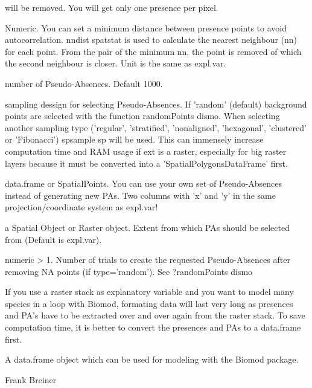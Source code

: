 \documentclass[a4paper]{book}
\begin{document}
\begin{Arguments}
\begin{ldescription}
will be removed. You will get only one presence per pixel.
\item[\code{mindist}] Numeric. You can set a minimum distance between presence points to avoid
autocorrelation. nndist spatstat is used to calculate the nearest neighbour (nn)
for each point. From the pair of the minimum nn, the point is removed of which the second
neighbour is closer. Unit is the same as expl.var.
\item[\code{n}] number of Pseudo-Absences. Default 1000.
\item[\code{type}] sampling dessign for selecting Pseudo-Absences. If \bsl{}'random\bsl{}' (default) background points are selected with the 
function randomPoints dismo. When selecting another sampling type (\bsl{}'regular\bsl{}', \bsl{}'stratified\bsl{}', \bsl{}'nonaligned\bsl{}',
\bsl{}'hexagonal\bsl{}', \bsl{}'clustered\bsl{}' or \bsl{}'Fibonacci\bsl{}') spsample sp will be used. This can immensely increase computation time and RAM usage if ext is a raster,
especially for big raster layers because it must be converted into a  \bsl{}'SpatialPolygonsDataFrame\bsl{}' first.
\item[\code{PApoint}] data.frame or SpatialPoints. You can use your own set of Pseudo-Absences
instead of generating new PAs. Two columns with \bsl{}'x\bsl{}' and \bsl{}'y\bsl{}' in the same
projection/coordinate system as expl.var!
\item[\code{ext}] a Spatial Object or Raster object. Extent from which PAs should be selected from (Default is expl.var).
\item[\code{tryf}] numeric > 1. Number of trials to create the requested Pseudo-Absences after removing NA points (if type='random'). See ?randomPoints dismo
\end{ldescription}
\end{Arguments}
%
\begin{Details}\relax
If you use a raster stack as explanatory variable and you want to model many species in a loop with Biomod, formating data will last very long as presences and PA's have to be extracted over and over again from the raster stack. To save computation time, it is better to convert the presences and PAs to a data.frame first.
\end{Details}
%
\begin{Value}
A data.frame object which can be used for modeling with the Biomod package.
\end{Value}
%
\begin{Author}\relax
Frank Breiner 
\end{Author}
\end{document}
